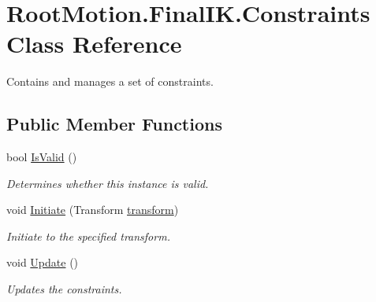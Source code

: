 \hypertarget{class_root_motion_1_1_final_i_k_1_1_constraints}{}\section{Root\+Motion.\+Final\+I\+K.\+Constraints Class Reference}
\label{class_root_motion_1_1_final_i_k_1_1_constraints}


Contains and manages a set of constraints.  


\subsection*{Public Member Functions}
\begin{DoxyCompactItemize}
\item 
bool \mbox{\hyperlink{class_root_motion_1_1_final_i_k_1_1_constraints_ab86c3dc8dc072a9841cc047d4faae59d}{Is\+Valid}} ()
\begin{DoxyCompactList}\small\item\em Determines whether this instance is valid. \end{DoxyCompactList}\item 
void \mbox{\hyperlink{class_root_motion_1_1_final_i_k_1_1_constraints_ab342972a3cf7e338078b0676a0ae7197}{Initiate}} (Transform \mbox{\hyperlink{class_root_motion_1_1_final_i_k_1_1_constraints_abf9e4eec6aef044f13ea14920102a5da}{transform}})
\begin{DoxyCompactList}\small\item\em Initiate to the specified transform. \end{DoxyCompactList}\item 
void \mbox{\hyperlink{class_root_motion_1_1_final_i_k_1_1_constraints_a4e32238714047643472777aab04b502d}{Update}} ()
\begin{DoxyCompactList}\small\item\em Updates the constraints. \end{DoxyCompactList}\end{DoxyCompactItemize}
